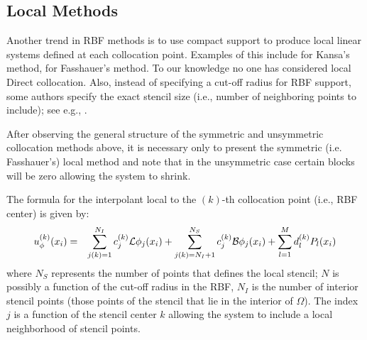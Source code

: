 \documentclass[11pt]{report}
\begin{document}
{%


\subsection{Local Methods}

Another trend in RBF methods is to use compact support to produce local linear systems defined at each collocation point. Examples of this include \cite{Sarler2006, Vertnik2006} for Kansa's method, \cite{Stevens2008a, Stevens2009a, Stevens2009b} for Fasshauer's method. To our knowledge no one has considered local Direct collocation.  Also, instead of specifying a cut-off radius for RBF support, some authors specify the exact stencil size (i.e., number of neighboring points to include); see e.g., \cite{Divo2007, Stevens2009b}. 

After observing the general structure of the symmetric and unsymmetric collocation methods above, it is necessary only to present the symmetric (i.e. Fasshauer's) local method and note that in the unsymmetric case certain blocks will be zero allowing the system to shrink. 

The formula for the interpolant local to the $(k)$-th collocation point (i.e., RBF center) is given by: 
\begin{eqnarray*}
u^{(k)}_\phi(x_i) & = & \sum_{j(k)=1}^{N_{I}}  c_j^{(k)} \mathcal{L}\phi_j(x_i) + \sum_{j(k)=N_{I} + 1}^{N_{S}} c^{(k)}_j\mathcal{B}\phi_j(x_i) + \sum_{l=1}^{M}d^{(k)}_l P_l(x_i)
\end{eqnarray*}
where $N_{S}$ represents the number of points that defines the local stencil; $N$ is possibly a function of the cut-off radius in the RBF, $N_{I}$ is the number of interior stencil points (those points of the stencil that lie in the interior of $\Omega$). The index $j$ is a function of the stencil center $k$ allowing the system to include a local neighborhood of stencil points.

}
\end{document}
